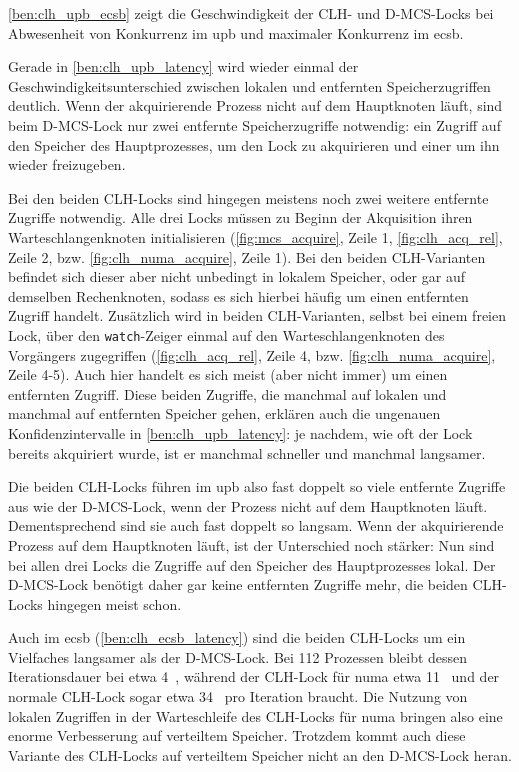 \autoref{ben:clh_upb_ecsb} zeigt die Geschwindigkeit der CLH- und D-MCS-Locks
bei Abwesenheit von \gls{Konkurrenz} im \gls{upb}
und maximaler \gls{Konkurrenz} im \gls{ecsb}.

Gerade in \autoref{ben:clh_upb_latency} wird wieder einmal der Geschwindigkeitsunterschied zwischen lokalen und entfernten Speicherzugriffen deutlich.
Wenn der akquirierende Prozess nicht auf dem Hauptknoten läuft,
sind beim D-MCS-Lock nur zwei entfernte Speicherzugriffe notwendig:
ein Zugriff auf den Speicher des Hauptprozesses,
um den Lock zu akquirieren
und einer um ihn wieder freizugeben.

Bei den beiden CLH-Locks sind hingegen meistens noch zwei weitere entfernte Zugriffe notwendig.
Alle drei Locks müssen zu Beginn der Akquisition ihren Warteschlangenknoten initialisieren
(\autoref{fig:mcs_acquire}, Zeile 1, \autoref{fig:clh_acq_rel}, Zeile 2, bzw. \autoref{fig:clh_numa_acquire}, Zeile 1).
Bei den beiden CLH-Varianten befindet sich dieser aber nicht unbedingt in lokalem Speicher,
oder gar auf demselben Rechenknoten,
sodass es sich hierbei häufig um einen entfernten Zugriff handelt.
Zusätzlich wird in beiden CLH-Varianten,
selbst bei einem freien Lock,
über den \texttt{watch}-Zeiger einmal auf den Warteschlangenknoten des Vorgängers zugegriffen (\autoref{fig:clh_acq_rel}, Zeile 4, bzw. \autoref{fig:clh_numa_acquire}, Zeile 4-5).
Auch hier handelt es sich meist (aber nicht immer) um einen entfernten Zugriff.
Diese beiden Zugriffe,
die manchmal auf lokalen und manchmal auf entfernten Speicher gehen,
erklären auch die ungenauen Konfidenzintervalle in \autoref{ben:clh_upb_latency}:
je nachdem,
wie oft der Lock bereits akquiriert wurde,
ist er manchmal schneller und manchmal langsamer.

Die beiden CLH-Locks führen im \gls{upb} also fast doppelt so viele entfernte Zugriffe aus
wie der D-MCS-Lock,
wenn der Prozess nicht auf dem Hauptknoten läuft.
Dementsprechend sind sie auch fast doppelt so langsam.
Wenn der akquirierende Prozess auf dem Hauptknoten läuft,
ist der Unterschied noch stärker:
Nun sind bei allen drei Locks die Zugriffe auf den Speicher des Hauptprozesses lokal.
Der D-MCS-Lock benötigt daher gar keine entfernten Zugriffe mehr,
die beiden CLH-Locks hingegen meist schon.

Auch im \gls{ecsb} (\autoref{ben:clh_ecsb_latency}) sind die beiden CLH-Locks um ein Vielfaches langsamer
als der D-MCS-Lock.
Bei 112 Prozessen bleibt dessen Iterationsdauer bei etwa 4~,
während der CLH-Lock für \gls{numa} etwa 11~
und der normale CLH-Lock sogar etwa 34~ pro Iteration braucht.
Die Nutzung von lokalen Zugriffen in der Warteschleife des CLH-Locks für \gls{numa} bringen also eine enorme Verbesserung
auf verteiltem Speicher.
Trotzdem kommt auch diese Variante des CLH-Locks auf verteiltem Speicher nicht an den D-MCS-Lock heran.

